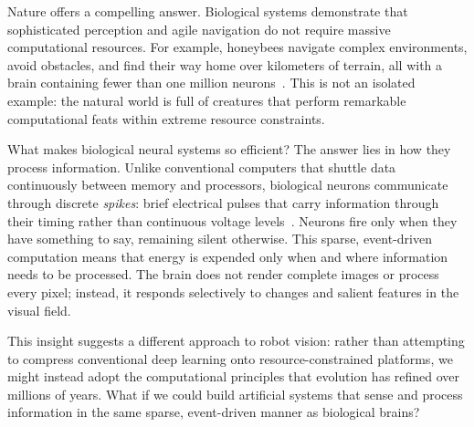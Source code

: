 
Nature offers a compelling answer. Biological systems demonstrate that sophisticated perception and agile navigation do not require massive computational resources. For example, honeybees navigate complex environments, avoid obstacles, and find their way home over kilometers of terrain, all with a brain containing fewer than one million neurons~\cite{menzel2001cognitive}. This is not an isolated example: the natural world is full of creatures that perform remarkable computational feats within extreme resource constraints.


What makes biological neural systems so efficient? The answer lies in how they process information. Unlike conventional computers that shuttle data continuously between memory and processors, biological neurons communicate through discrete \emph{spikes}: brief electrical pulses that carry information through their timing rather than continuous voltage levels~\cite{sterling2015principles}. Neurons fire only when they have something to say, remaining silent otherwise. This sparse, event-driven computation means that energy is expended only when and where information needs to be processed. The brain does not render complete images or process every pixel; instead, it responds selectively to changes and salient features in the visual field.

This insight suggests a different approach to robot vision: rather than attempting to compress conventional deep learning onto resource-constrained platforms, we might instead adopt the computational principles that evolution has refined over millions of years. What if we could build artificial systems that sense and process information in the same sparse, event-driven manner as biological brains?

